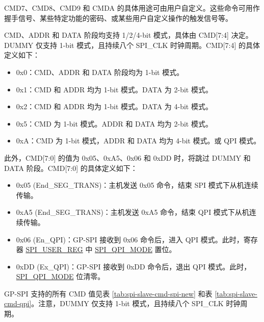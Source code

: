 \documentclass[main\_\_CN.tex]{subfiles}
\begin{document}
CMD7、CMD8、CMD9 和 CMDA 的具体用途可由用户自定义。这些命令可用作握手信号、某些特定功能的密码、或某些用户自定义操作的触发信号等。

CMD、ADDR 和 DATA 阶段均支持 1/2/4-bit 模式，具体由 CMD[7:4] 决定。DUMMY 仅支持 1-bit 模式，且持续八个 SPI\_CLK 时钟周期。CMD[7:4] 的具体定义如下：

\begin{itemize}
    \item 0x0：CMD、ADDR 和 DATA 阶段均为 1-bit 模式。
    \item 0x1：CMD 和 ADDR 均为 1-bit 模式。DATA 为 2-bit 模式。
    \item 0x2：CMD 和 ADDR 均为 1-bit 模式。DATA 为 4-bit 模式。
    \item 0x5：CMD 为 1-bit 模式。ADDR 和 DATA 均为 2-bit 模式。
    \item 0xA：CMD 为 1-bit 模式，ADDR 和 DATA 均为 4-bit 模式。或 QPI 模式。
\end{itemize}

此外，CMD[7:0] 的值为 0x05、0xA5、0x06 和 0xDD 时，将跳过 DUMMY 和 DATA 阶段。CMD[7:0] 的具体定义如下：

\begin{itemize}
    \item \label{cmd:ENDSEGTRANS}0x05 (End\_SEG\_TRANS)：主机发送 0x05 命令，结束 SPI 模式下从机连续传输。
    \item 0xA5 (End\_SEG\_TRANS)：主机发送 0xA5 命令，结束 QPI 模式下从机连续传输。 
    \item 0x06 (En\_QPI)：GP-SPI 接收到 0x06 命令后，进入 QPI 模式。此时，寄存器 \hyperref[regdesc:SPIUSERREG]{SPI\_USER\_REG} 中 \hyperref[fielddesc:SPIQPIMODE]{SPI\_QPI\_MODE} 置位。
    \item 0xDD (Ex\_QPI)：GP-SPI 接收到 0xDD 命令后，退出 QPI 模式。此时， \hyperref[fielddesc:SPIQPIMODE]{SPI\_QPI\_MODE} 位清零。
\end{itemize}


GP-SPI 支持的所有 CMD 值见表 \ref{tab:spi-slave-cmd-spi-new} 和表 \ref{tab:spi-slave-cmd-qpi}。注意，DUMMY 仅支持 1-bit 模式，且持续八个 SPI\_CLK 时钟周期。
\end{document}

